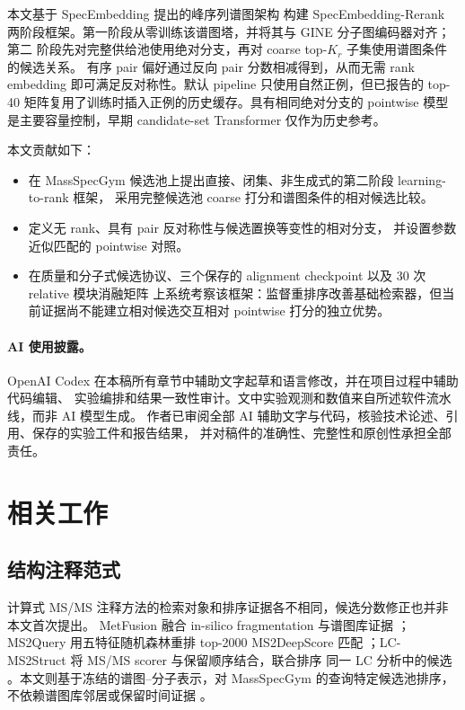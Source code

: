 \documentclass[UTF8,11pt]{ctexart}
\newcommand{\method}{SpecEmbedding-Rerank}
\begin{document}
本文基于 SpecEmbedding 提出的峰序列谱图架构 \cite{xiong2025specembedding} 构建
\method{} 两阶段框架。第一阶段从零训练该谱图塔，并将其与 GINE 分子图编码器对齐；第二
阶段先对完整供给池使用绝对分支，再对 coarse top-$K_r$ 子集使用谱图条件的候选关系。
有序 pair 偏好通过反向 pair 分数相减得到，从而无需 rank embedding 即可满足反对称性。默认
pipeline 只使用自然正例，但已报告的 top-40 矩阵复用了训练时插入正例的历史缓存。具有相同绝对分支的
pointwise 模型是主要容量控制，早期 candidate-set Transformer 仅作为历史参考。

本文贡献如下：

\begin{itemize}
  \item 在 MassSpecGym 候选池上提出直接、闭集、非生成式的第二阶段 learning-to-rank 框架，
  采用完整候选池 coarse 打分和谱图条件的相对候选比较。
  \item 定义无 rank、具有 pair 反对称性与候选置换等变性的相对分支，
  并设置参数近似匹配的 pointwise 对照。
  \item 在质量和分子式候选协议、三个保存的 alignment checkpoint 以及 30 次 relative 模块消融矩阵
  上系统考察该框架：监督重排序改善基础检索器，但当前证据尚不能建立相对候选交互相对
  pointwise 打分的独立优势。
\end{itemize}

\paragraph{AI 使用披露。}
OpenAI Codex 在本稿所有章节中辅助文字起草和语言修改，并在项目过程中辅助代码编辑、
实验编排和结果一致性审计。文中实验观测和数值来自所述软件流水线，而非 AI 模型生成。
作者已审阅全部 AI 辅助文字与代码，核验技术论述、引用、保存的实验工件和报告结果，
并对稿件的准确性、完整性和原创性承担全部责任。

\section{相关工作}

\subsection{结构注释范式}

计算式 MS/MS 注释方法的检索对象和排序证据各不相同，候选分数修正也并非本文首次提出。
MetFusion 融合 in-silico fragmentation 与谱图库证据 \cite{gerlich2013metfusion}；
MS2Query 用五特征随机森林重排 top-2000 MS2DeepScore 匹配
\cite{dejonge2023ms2query}；LC-MS2Struct 将 MS/MS scorer 与保留顺序结合，联合排序
同一 LC 分析中的候选 \cite{bach2022lcms2struct}。本文则基于冻结的谱图--分子表示，对
MassSpecGym 的查询特定候选池排序，不依赖谱图库邻居或保留时间证据
\cite{bushuiev2024massspecgym}。
\end{document}
